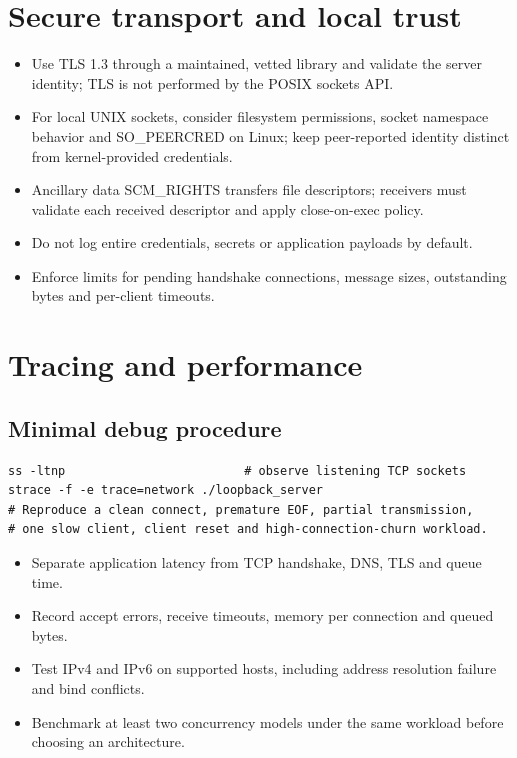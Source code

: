 \documentclass[11pt,letterpaper,oneside]{report}
\begin{document}
\chapter{Secure transport and local trust}
\begin{itemize}
\item Use TLS 1.3 through a maintained, vetted library and validate the server identity; TLS is not performed by the POSIX sockets API.
\item For local UNIX sockets, consider filesystem permissions, socket namespace behavior and SO\_PEERCRED on Linux; keep peer-reported identity distinct from kernel-provided credentials.
\item Ancillary data SCM\_RIGHTS transfers file descriptors; receivers must validate each received descriptor and apply close-on-exec policy.
\item Do not log entire credentials, secrets or application payloads by default.
\item Enforce limits for pending handshake connections, message sizes, outstanding bytes and per-client timeouts.
\end{itemize}
\chapter{Tracing and performance}
\section{Minimal debug procedure}
\begin{lstlisting}
ss -ltnp                         # observe listening TCP sockets
strace -f -e trace=network ./loopback_server
# Reproduce a clean connect, premature EOF, partial transmission,
# one slow client, client reset and high-connection-churn workload.
\end{lstlisting}
\begin{itemize}
\item Separate application latency from TCP handshake, DNS, TLS and queue time.
\item Record accept errors, receive timeouts, memory per connection and queued bytes.
\item Test IPv4 and IPv6 on supported hosts, including address resolution failure and bind conflicts.
\item Benchmark at least two concurrency models under the same workload before choosing an architecture.
\end{itemize}
\end{document}
